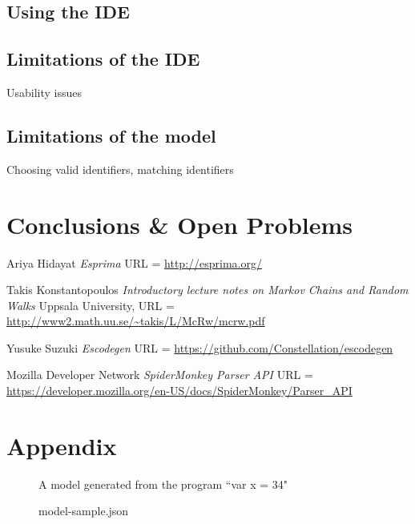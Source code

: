 \documentclass{article}
\begin{document}
\subsection{Using the IDE}

\subsection{Limitations of the IDE}

Usability issues

\subsection{Limitations of the model}

Choosing valid identifiers, matching identifiers

\section{Conclusions \& Open Problems}

\clearpage
\begin{thebibliography}{1}

	 Ariya Hidayat {\em Esprima}
		URL = \url{http://esprima.org/}

	 Takis Konstantopoulos {\em Introductory lecture notes on
		Markov Chains and Random Walks} Uppsala University,
		URL = \url{http://www2.math.uu.se/~takis/L/McRw/mcrw.pdf}

	 Yusuke Suzuki {\em Escodegen}
		URL = \url{https://github.com/Constellation/escodegen}

	 Mozilla Developer Network {\em SpiderMonkey Parser API}
		URL = \url{https://developer.mozilla.org/en-US/docs/SpiderMonkey/Parser_API}

\end{thebibliography}

\clearpage
\section*{Appendix}

\begin{figure}[h!]
	\caption{model-sample.json}
	\centering
	A model generated from the program ``var x = 34"
\end{figure}


\end{document}
